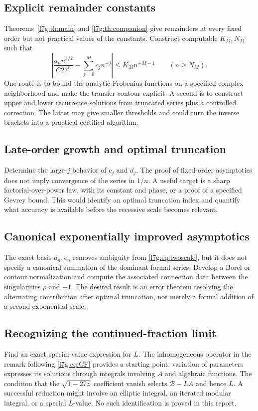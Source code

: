 \documentclass[11pt,letterpaper]{article}
\theoremstyle{remark}\newtheorem{remark}[theorem]{Remark}
\newcounter{l7gtrsavedeq}
\begin{document}
\subsection{Explicit remainder constants}\label{l7g:sec:explicit}
Theorems~\ref{l7g:th:main} and \ref{l7g:th:companion} give remainders at every
fixed order but not practical values of the constants. Construct
computable $K_M,N_M$ such that
\[
 \left|\frac{a_n n^{3/2}}{C27^n}-\sum_{j=0}^{M}c_jn^{-j}\right|
 \le K_M n^{-M-1}\qquad(n\ge N_M).
\]
One route is to bound the analytic Frobenius functions on a specified
complex neighborhood and make the transfer contour explicit. A second
is to construct upper and lower recurrence solutions from truncated
series plus a controlled correction. The latter may give smaller
thresholds and could turn the inverse brackets into a practical
certified algorithm.

\subsection{Late-order growth and optimal truncation}
Determine the large-$j$ behavior of $c_j$ and $d_j$. The proof of
fixed-order asymptotics does not imply convergence of the series in
$1/n$. A useful target is a sharp factorial-over-power law, with its
constant and phase, or a proof of a specified Gevrey bound. This would
identify an optimal truncation index and quantify what accuracy is
available before the recessive scale becomes relevant.

\subsection{Canonical exponentially improved asymptotics}
The exact basis $a_n,e_n$ removes ambiguity from
\eqref{l7g:eq:twoscale}, but it does not specify a canonical summation of the
dominant formal series. Develop a Borel or contour normalization and
compute the associated connection data between the singularities
$\rho$ and $-1$. The desired result is an error theorem resolving the
alternating contribution after optimal truncation, not merely a formal
addition of a second exponential scale.

\subsection{Recognizing the continued-fraction limit}
Find an exact special-value expression for $L$. The inhomogeneous
operator in the remark following \eqref{l7g:eq:CF} provides a starting point:
variation of parameters expresses its solutions through integrals
involving $A$ and algebraic functions. The condition that the
$\sqrt{1-27z}$ coefficient vanish selects $\mathcal B-LA$ and hence $L$.
A successful reduction might involve an elliptic integral, an iterated
modular integral, or a special $L$-value. No such identification is
proved in this report.
\end{document}
